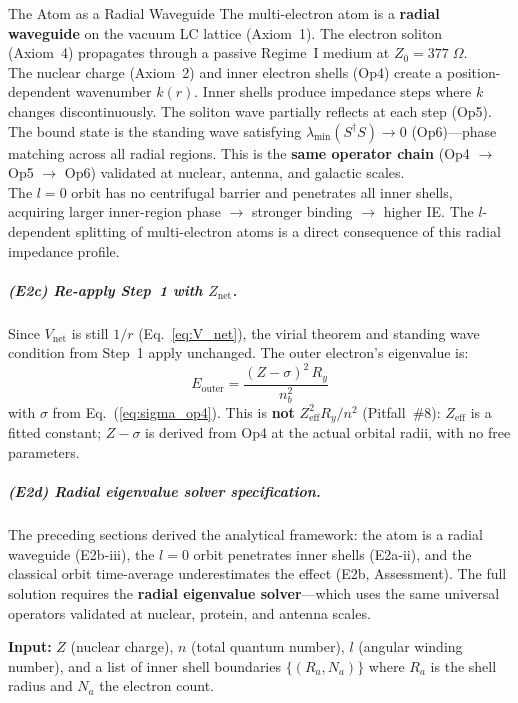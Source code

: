 \begin{resultbox}{The Atom as a Radial Waveguide}
The multi-electron atom is a \textbf{radial waveguide}
on the vacuum LC lattice (Axiom~1).  The electron
soliton (Axiom~4) propagates through a passive
Regime~I medium at $Z_0 = 377\;\Omega$.\\[4pt]
The nuclear charge (Axiom~2) and inner electron shells
(Op4) create a position-dependent wavenumber $k(r)$.
Inner shells produce impedance steps where $k$ changes
discontinuously.  The soliton wave partially reflects
at each step (Op5).\\[4pt]
The bound state is the standing wave satisfying
$\lambda_{\min}(S^\dagger S) \to 0$ (Op6)---phase
matching across all radial regions.  This is the
\textbf{same operator chain}
(Op4 $\to$ Op5 $\to$ Op6) validated at nuclear,
antenna, and galactic scales.\\[4pt]
The $l = 0$ orbit has no centrifugal barrier and
penetrates all inner shells, acquiring larger
inner-region phase $\to$ stronger binding $\to$
higher IE.  The $l$-dependent splitting of
multi-electron atoms is a direct consequence of this
radial impedance profile.
\end{resultbox}

\subparagraph{(E2c) Re-apply Step~1 with $Z_{\text{net}}$.}

Since $V_{\text{net}}$ is still $1/r$
(Eq.~\ref{eq:V_net}), the virial theorem and standing
wave condition from Step~1 apply unchanged.  The outer
electron's eigenvalue is:
\begin{equation}
    E_{\text{outer}} = \frac{(Z - \sigma)^2\, R_y}{n_b^2}
    \label{eq:E_outer_cross}
\end{equation}
with $\sigma$ from Eq.~(\ref{eq:sigma_op4}).
This is \textbf{not} $Z_{\text{eff}}^2 R_y / n^2$
(Pitfall~\#8): $Z_{\text{eff}}$ is a fitted
constant; $Z - \sigma$ is derived from Op4 at the
actual orbital radii, with no free parameters.

\subparagraph{(E2d) Radial eigenvalue solver specification.}

The preceding sections derived the analytical framework:
the atom is a radial waveguide (E2b-iii), the
$l = 0$ orbit penetrates inner shells (E2a-ii),
and the classical orbit time-average underestimates
the effect (E2b, Assessment).  The full solution
requires the \textbf{radial eigenvalue solver}---which
uses the same universal operators validated at
nuclear, protein, and antenna scales.

\noindent\textbf{Input:}
$Z$ (nuclear charge), $n$ (total quantum number),
$l$ (angular winding number), and a list of inner
shell boundaries $\{(R_a, N_a)\}$ where $R_a$ is
the shell radius and $N_a$ the electron count.

